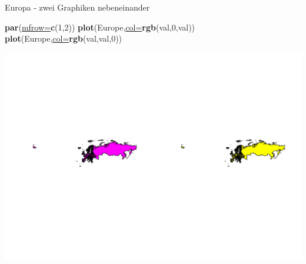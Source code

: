 \documentclass[ignorenonframetext,]{beamer}
\newenvironment{Shaded}{\begin{snugshade}}{\end{snugshade}}
\newcommand{\KeywordTok}[1]{\textcolor[rgb]{0.26,0.66,0.93}{\textbf{#1}}}
\newcommand{\DataTypeTok}[1]{\textcolor[rgb]{0.74,0.68,0.62}{\underline{#1}}}
\newcommand{\DecValTok}[1]{\textcolor[rgb]{0.27,0.67,0.26}{#1}}
\newcommand{\NormalTok}[1]{\textcolor[rgb]{0.74,0.68,0.62}{#1}}
\begin{document}
\begin{frame}[fragile]{Europa - zwei Graphiken nebeneinander}

\begin{Shaded}
\begin{Highlighting}[]
\KeywordTok{par}\NormalTok{(}\DataTypeTok{mfrow=}\KeywordTok{c}\NormalTok{(}\DecValTok{1}\NormalTok{,}\DecValTok{2}\NormalTok{))}
\KeywordTok{plot}\NormalTok{(Europe,}\DataTypeTok{col=}\KeywordTok{rgb}\NormalTok{(val,}\DecValTok{0}\NormalTok{,val))}
\KeywordTok{plot}\NormalTok{(Europe,}\DataTypeTok{col=}\KeywordTok{rgb}\NormalTok{(val,val,}\DecValTok{0}\NormalTok{))}
\end{Highlighting}
\end{Shaded}

\includegraphics{Geomedizin_files/figure-beamer/unnamed-chunk-68-1.pdf}

\end{frame}
\end{document}
